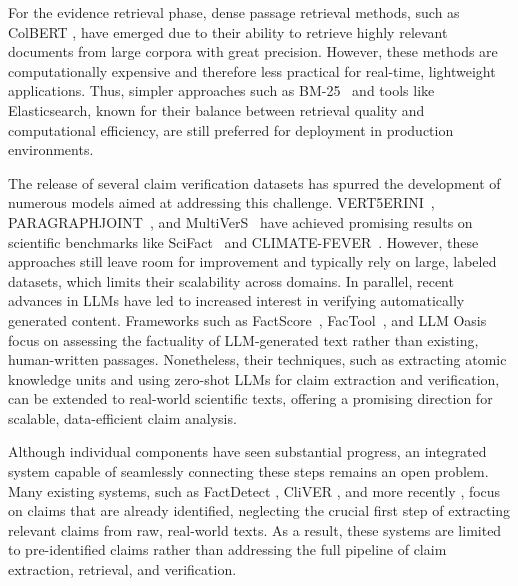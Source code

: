 \documentclass[11pt]{article}
\begin{document}
For the evidence retrieval phase, dense passage retrieval methods, such as ColBERT \cite{khattab2020colbertefficienteffectivepassage}, have emerged due to their ability to retrieve highly relevant documents from large corpora with great precision. However, these methods are computationally expensive and therefore less practical for real-time, lightweight applications. Thus, simpler approaches such as BM-25~\cite{Robertson2009ThePR} and tools like Elasticsearch, known for their balance between retrieval quality and computational efficiency, are still preferred for deployment in production environments.

The release of several claim verification datasets has spurred the development of numerous models aimed at addressing this challenge. VERT5ERINI~\cite{pradeep-etal-2021-scientific}, PARAGRAPHJOINT~\cite{li2021paragraphlevelmultitasklearningmodel}, and MultiVerS~\cite{wadden2022multiversimprovingscientificclaim} have achieved promising results on scientific benchmarks like SciFact~\cite{wadden-etal-2020-fact} and CLIMATE-FEVER~\cite{diggelmann2021climatefeverdatasetverificationrealworld}. However, these approaches still leave room for improvement and typically rely on large, labeled datasets, which limits their scalability across domains. In parallel, recent advances in LLMs have led to increased interest in verifying automatically generated content. Frameworks such as FactScore~\cite{min-etal-2023-factscore}, FacTool~\cite{chern2023factoolfactualitydetectiongenerative}, and LLM Oasis~\cite{scirè2024truthmirageendtoendfactuality} focus on assessing the factuality of LLM-generated text rather than existing, human-written passages. Nonetheless, their techniques, such as extracting atomic knowledge units and using zero-shot LLMs for claim extraction and verification, can be extended to real-world scientific texts, offering a promising direction for scalable, data-efficient claim analysis.

Although individual components have seen substantial progress, an integrated system capable of seamlessly connecting these steps remains an open problem. Many existing systems, such as FactDetect \cite{jafari2024robustclaimverificationfact}, CliVER \cite{10.1093/jamiaopen/ooae021}, and more recently \cite{liang2025, vladika-etal-2025-step}, focus on claims that are already identified, neglecting the crucial first step of extracting relevant claims from raw, real-world texts. As a result, these systems are limited to pre-identified claims rather than addressing the full pipeline of claim extraction, retrieval, and verification.
\end{document}
